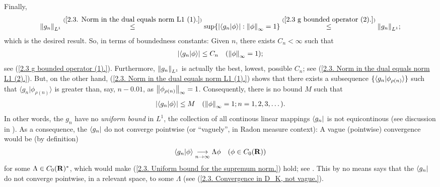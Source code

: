 %
Finally, %
%
  \begin{align}\label{2.3. Norm in the dual equals norm L1 (2).}
    \norma{L^1}{g_n}
      \citeleq{\ref{2.3. Norm in the dual equals norm L1 (1).}} 
    \sup\set{
    \magnitude{\bra{g_n}\ket{\phi}}
    }{
      \norma{\infty}{\phi} = 1
    }
      \citeleq{\ref{2.3  g  bounded operator (2).}}
    \norma{L^1}{g_n};
  \end{align}  %
%
which is the desired result. %
%
So, in terms of boundedness constants: %
Given $n$, there exists $C_{n} < \infty$ such that 
    \begin{align}\label{2.3. Optimal bound.}
      \left\lvert 
        \bra{g_n}\ket{\phi} 
      \right\rvert 
        \leq 
      C_{n} \quad (\norma{\infty}{\phi} = 1); 
    \end{align}
see (\ref{2.3  g  bounded operator (1).}). 
Furthermore, %
%
  $\norma{L^1}{g_n}$ is actually the best, \ie lowest, possible $C_{n}$; see %
    (\ref{2.3. Norm in the dual equals norm L1 (2).}). %
But, on the other hand, %
%
  (\ref{2.3. Norm in the dual equals norm L1 (1).}) %
%
shows that there exists a subsequence %
%
  $\singleton{\langle{g_n}\lvert{\phi_{\rho(n)}}\rangle}$ %
%
such that %
%
  $\langle{g_n}\lvert{\phi_{\rho(n)}}\rangle$ %
% 
is greater than, say, $n -0.01$, as $\norma{\infty}{\phi_{\rho(n)}} = 1$. %
%
Consequently, there is no bound $M$ such that %
%
  \begin{align}\label{2.3. Uniform bound for the supremum norm.}
    \left\lvert 
      \bra{g_n}\ket{\phi} 
    \right\rvert 
      \leq M
    \quad (\norma{\infty}{\phi} = 1; \counting{n}).
  \end{align}
%
In other words, the $g_n$ have no \textit{uniform bound} in ${L^1}$, %
  \ie %
the collection of all continous linear mappings %
%
  $\bra{g_n}$ %
%
is not equicontinous %
%
  (see discussion in ). %
%
As a consequence, %
%
  the $\bra{g_n}$ %
%
do not converge pointwise (or ``vaguely'', in Radon measure context): %
A vague (\ie pointwise) convergence would be (by definition) %
%
  \begin{align}
    \bra{g_n}\ket{\phi} \tendsto{n}{\infty} \Lambda \phi %
    \quad (\phi \in C_0(\R)) %
  \end{align}
%
for some $\Lambda\in C_0(\R)^\ast$, which would make %
%
  (\ref{2.3. Uniform bound for the supremum norm.})
%
hold; see . %
%
This by no means says that the %
%
  $\bra{g_n}$ %
%
do not converge pointwise, in a relevant space, to some $\Lambda$ (see %
%
  (\ref{2.3. Convergence in D_K, not vague.}). %
%
\newline\newline\noindent
